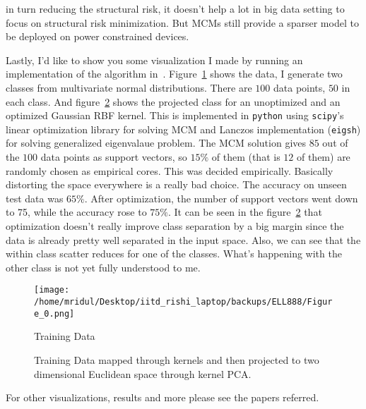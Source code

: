 \documentclass[11pt]{article}
\begin{document}
in turn reducing the structural risk, it doesn't help a lot in big data setting
to focus on structural risk minimization. But MCMs still provide a sparser model
to be deployed on power constrained devices.\par
Lastly, I'd like to show you some visualization I made by running an
implementation of the algorithm in~\cite{keropt}. Figure~\ref{fig:data} shows the data,
I generate two classes from multivariate normal distributions. There are $100$
data points, $50$ in each class. And figure~\ref{fig:kernelPCA} shows the projected class for
an unoptimized and an optimized Gaussian RBF kernel. This is implemented in
\texttt{python} using \texttt{scipy}'s linear optimization library for solving
MCM and Lanczos implementation (\texttt{eigsh}) for solving generalized
eigenvalaue problem. The MCM solution gives $85$ out of the $100$ data points as
support vectors, so $15\%$ of them (that is $12$ of them) are randomly chosen as
empirical cores. This was decided empirically. Basically distorting the space
everywhere is a really bad choice. The accuracy on unseen test data was $65\%$.
After optimization, the number of support vectors went down to 75, while the
accuracy rose to $75\%$. It can be seen in the figure~\ref{fig:kernelPCA} that
optimization doesn't really improve class separation by a big margin since the
data is already pretty well separated in the input space. Also, we can see that
the within class scatter reduces for one of the classes. What's happening with
the other class is not yet fully understood to me.
\begin{figure}[!htbp]
    \centering
    \texttt{[image: /home/mridul/Desktop/iitd\_rishi\_laptop/backups/ELL888/Figure\_0.png]}
    \caption{\label{fig:data}Training Data}
\end{figure}
\begin{figure}[!htbp]
    \centering
    \caption{\label{fig:kernelPCA}Training Data mapped through kernels and then projected
    to two dimensional Euclidean space through kernel PCA.}
\end{figure}\par
For other visualizations, results and more please see the papers referred.
\afterpage{\clearpage}
\end{document}
